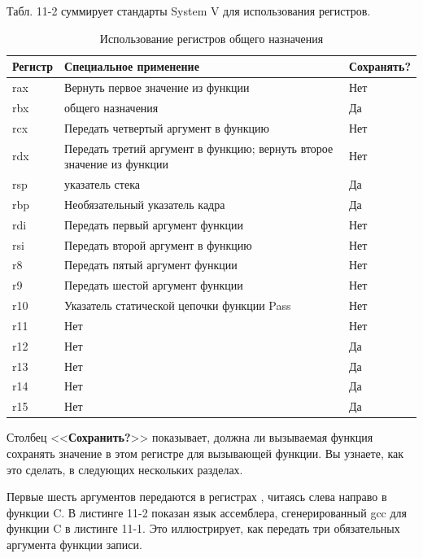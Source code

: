 Табл. 11-2 суммирует стандарты System V для использования регистров.

\begin{table}[h]
    \caption{Использование регистров общего назначения}
    \centering
    \begin{tabularx}{\textwidth}{lXl}
        \hline
        \textbf{Регистр} & \textbf{Специальное применение} & \textbf{Сохранять?} \\ \hline \hline
        \rowcolor{lightgray}
        rax & Вернуть первое значение из функции & Нет \\
        rbx & общего назначения & Да \\
        \rowcolor{lightgray}
        rcx & Передать четвертый аргумент в функцию & Нет \\
        rdx & Передать третий аргумент в функцию; вернуть второе значение из функции & Нет \\
        \rowcolor{lightgray}
        rsp & указатель стека & Да \\
        rbp & Необязательный указатель кадра & Да \\
        \rowcolor{lightgray}
        rdi & Передать первый аргумент функции & Нет \\
        rsi & Передать второй аргумент в функцию & Нет \\
        \rowcolor{lightgray}
        r8 & Передать пятый аргумент функции & Нет \\
        r9 & Передать шестой аргумент функции & Нет \\
        \rowcolor{lightgray}
        r10 & Указатель статической цепочки функции Pass & Нет \\
        r11 & Нет & Нет \\
        \rowcolor{lightgray}
        r12 & Нет & Да \\
        r13 & Нет & Да \\
        \rowcolor{lightgray}
        r14 & Нет & Да \\
        r15 & Нет & Да \\
    \end{tabularx}
    \label{table-descriptors}
\end{table}

Столбец <<\textbf{Сохранить?}>> показывает, должна ли вызываемая функция сохранять значение в этом регистре для вызывающей функции. Вы узнаете, как это сделать, в следующих нескольких разделах.

Первые шесть аргументов передаются в регистрах , читаясь слева направо в функции C. В листинге 11-2 показан язык ассемблера, сгенерированный gcc для функции C в листинге 11-1. Это иллюстрирует, как передать три обязательных аргумента функции записи.

